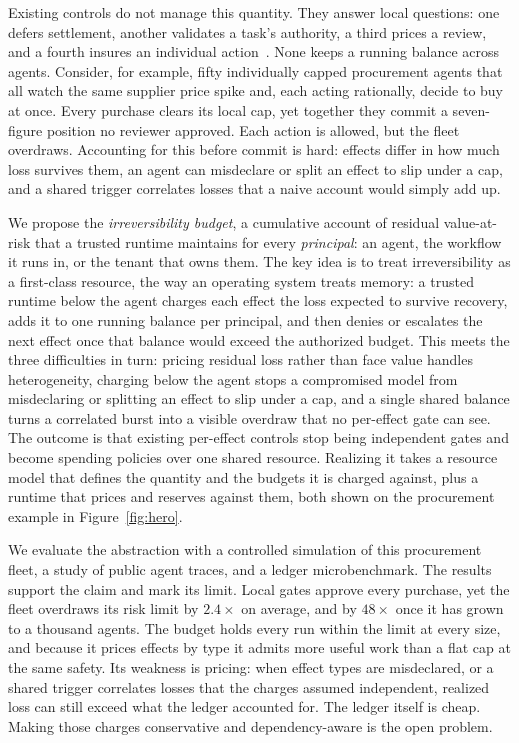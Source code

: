 \documentclass[sigconf]{acmart}
\begin{document}
Existing controls do not manage this quantity. They answer local questions: one defers settlement, another validates a task's authority, a third prices a review, and a fourth insures an individual action~\cite{Mohammadi2026Atomix,Chen2026Cordon,Madras2018LearningToDefer,Mozannar2020LearningToDefer,Chen2026AAI,Xu2026TraceEconomic,Hua2026ARS}. None keeps a running balance across agents. Consider, for example, fifty individually capped procurement agents that all watch the same supplier price spike and, each acting rationally, decide to buy at once. Every purchase clears its local cap, yet together they commit a seven-figure position no reviewer approved. Each action is allowed, but the fleet overdraws. Accounting for this before commit is hard: effects differ in how much loss survives them, an agent can misdeclare or split an effect to slip under a cap, and a shared trigger correlates losses that a naive account would simply add up.

We propose the \emph{irreversibility budget}, a cumulative account of residual value-at-risk that a trusted runtime maintains for every \emph{principal}: an agent, the workflow it runs in, or the tenant that owns them. The key idea is to treat irreversibility as a first-class resource, the way an operating system treats memory: a trusted runtime below the agent charges each effect the loss expected to survive recovery, adds it to one running balance per principal, and then denies or escalates the next effect once that balance would exceed the authorized budget. This meets the three difficulties in turn: pricing residual loss rather than face value handles heterogeneity, charging below the agent stops a compromised model from misdeclaring or splitting an effect to slip under a cap, and a single shared balance turns a correlated burst into a visible overdraw that no per-effect gate can see. The outcome is that existing per-effect controls stop being independent gates and become spending policies over one shared resource. Realizing it takes a resource model that defines the quantity and the budgets it is charged against, plus a runtime that prices and reserves against them, both shown on the procurement example in Figure~\ref{fig:hero}.

We evaluate the abstraction with a controlled simulation of this procurement fleet, a study of public agent traces, and a ledger microbenchmark. The results support the claim and mark its limit. Local gates approve every purchase, yet the fleet overdraws its risk limit by $2.4\times$ on average, and by $48\times$ once it has grown to a thousand agents. The budget holds every run within the limit at every size, and because it prices effects by type it admits more useful work than a flat cap at the same safety. Its weakness is pricing: when effect types are misdeclared, or a shared trigger correlates losses that the charges assumed independent, realized loss can still exceed what the ledger accounted for. The ledger itself is cheap. Making those charges conservative and dependency-aware is the open problem.
\end{document}
